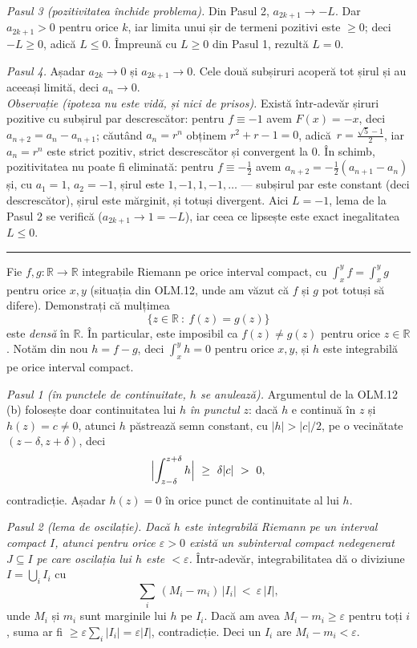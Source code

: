 \noindent\textit{Pasul 3 (pozitivitatea închide problema).} Din Pasul 2,
$a_{2k+1}\to-L$. Dar $a_{2k+1}>0$ pentru orice $k$, iar limita unui șir de
termeni pozitivi este $\ge0$; deci $-L\ge0$, adică $L\le0$. Împreună cu $L\ge0$
din Pasul 1, rezultă $L=0$.

\noindent\textit{Pasul 4.} Așadar $a_{2k}\to0$ și $a_{2k+1}\to0$. Cele două
subșiruri acoperă tot șirul și au aceeași limită, deci $a_n\to0$.\\[2pt]
\emph{Observație (ipoteza nu este vidă, și nici de prisos).} Există într-adevăr
șiruri pozitive cu subșirul par descrescător: pentru $f\equiv-1$ avem $F(x)=-x$,
deci $a_{n+2}=a_n-a_{n+1}$; căutând $a_n=r^n$ obținem $r^2+r-1=0$, adică\
$r=\frac{\sqrt5-1}{2}$, iar $a_n=r^n$ este strict pozitiv, strict descrescător și
convergent la $0$. În schimb, pozitivitatea nu poate fi eliminată: pentru
$f\equiv-\frac12$ avem $a_{n+2}=-\frac12(a_{n+1}-a_n)$ și, cu $a_1=1$, $a_2=-1$,
șirul este $1,-1,1,-1,\dots$ --- subșirul par este constant (deci descrescător),
șirul este mărginit, și totuși divergent. Aici $L=-1$, lema de la Pasul 2 se
verifică ($a_{2k+1}\to1=-L$), iar ceea ce lipsește este exact inegalitatea
$L\le0$.
\vspace{1mm}\hrule

Fie $f,g:\mathbb{R}\to\mathbb{R}$ integrabile Riemann pe orice interval compact,
cu $\int_x^{y}f=\int_x^{y}g$ pentru orice $x,y$ (situația din OLM.12, unde am văzut
că $f$ și $g$ pot totuși să difere). Demonstrați că mulțimea
\[ \{z\in\mathbb{R}\ :\ f(z)=g(z)\} \]
este \emph{densă} în $\mathbb{R}$. În particular, este imposibil ca
$f(z)\neq g(z)$ pentru orice $z\in\mathbb{R}$.
\sol Notăm din nou $h=f-g$, deci $\int_x^{y}h=0$ pentru orice $x,y$, și $h$ este
integrabilă pe orice interval compact.

\noindent\textit{Pasul 1 (în punctele de continuitate, $h$ se anulează).}
Argumentul de la OLM.12\,(b) folosește doar continuitatea lui $h$ \emph{în punctul}
$z$: dacă $h$ e continuă în $z$ și $h(z)=c\neq0$, atunci $h$ păstrează semn
constant, cu $|h|>|c|/2$, pe o vecinătate $(z-\delta,z+\delta)$, deci
\[ \Bigl|\int_{z-\delta}^{z+\delta}h\Bigr|\ \ge\ \delta|c|\ >\ 0, \]
contradicție. Așadar $h(z)=0$ în orice punct de continuitate al lui $h$.

\noindent\textit{Pasul 2 (lema de oscilație).} \emph{Dacă $h$ este integrabilă
Riemann pe un interval compact $I$, atunci pentru orice $\varepsilon>0$ există un
subinterval compact nedegenerat $J\subseteq I$ pe care oscilația lui $h$ este
$<\varepsilon$.} Într-adevăr, integrabilitatea dă o diviziune $I=\bigcup_i I_i$ cu
\[ \sum_i\,(M_i-m_i)\,|I_i|\ <\ \varepsilon\,|I|, \]
unde $M_i$ și $m_i$ sunt marginile lui $h$ pe $I_i$. Dacă am avea
$M_i-m_i\ge\varepsilon$ pentru toți $i$, suma ar fi $\ge\varepsilon\sum_i|I_i|
=\varepsilon|I|$, contradicție. Deci un $I_i$ are $M_i-m_i<\varepsilon$.

